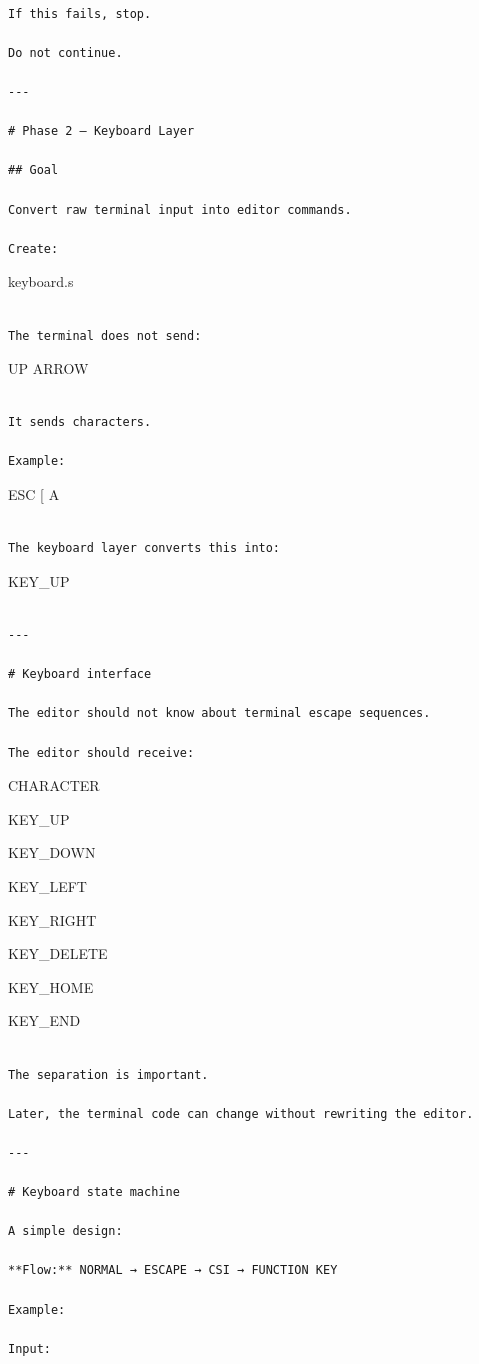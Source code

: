 \documentclass[
  oneside,
  openany]{book}
\begin{document}
\begin{verbatim}

If this fails, stop.

Do not continue.

---

# Phase 2 — Keyboard Layer

## Goal

Convert raw terminal input into editor commands.

Create:
\end{verbatim}

keyboard.s

\begin{verbatim}

The terminal does not send:
\end{verbatim}

UP ARROW

\begin{verbatim}

It sends characters.

Example:
\end{verbatim}

ESC {[} A

\begin{verbatim}

The keyboard layer converts this into:
\end{verbatim}

KEY\_UP

\begin{verbatim}

---

# Keyboard interface

The editor should not know about terminal escape sequences.

The editor should receive:
\end{verbatim}

CHARACTER

KEY\_UP

KEY\_DOWN

KEY\_LEFT

KEY\_RIGHT

KEY\_DELETE

KEY\_HOME

KEY\_END

\begin{verbatim}

The separation is important.

Later, the terminal code can change without rewriting the editor.

---

# Keyboard state machine

A simple design:

**Flow:** NORMAL → ESCAPE → CSI → FUNCTION KEY

Example:

Input:
\end{verbatim}
\end{document}
